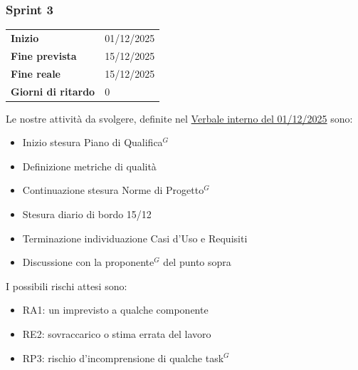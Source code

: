 \subsubsection{Sprint 3}


\begin{tabular}{p{} p{}}
	\textbf{Inizio} & 01/12/2025 \\
	\textbf{Fine prevista} & 15/12/2025 \\
	\textbf{Fine reale} & 15/12/2025 \\
	\textbf{Giorni di ritardo} & 0
\end{tabular}
\newline \newline 
Le nostre attività da svolgere, definite nel \href{https://nullpointersgroup.github.io/Documentazione/output/RTB/Verbali%20Interni/2025-12-01_verbale_interno.pdf}{Verbale interno del 01/12/2025} sono:
\begin{itemize}[itemsep=5pt, parsep=1pt, label=$\scriptstyle\bullet$]
	\item Inizio stesura Piano di Qualifica$^G$
	\item Definizione metriche di qualità
	\item Continuazione stesura Norme di Progetto$^G$
	\item Stesura diario di bordo 15/12
	\item Terminazione individuazione Casi d'Uso e Requisiti
	\item Discussione con la proponente$^G$ del punto sopra
\end{itemize}


I possibili rischi attesi sono:
\begin{itemize}[itemsep=5pt, parsep=1pt, label=$\scriptstyle\bullet$]
	\item RA1: un imprevisto a qualche componente
	\item RE2: sovraccarico o stima errata del lavoro
	\item RP3: rischio d'incomprensione di qualche task$^G$
\end{itemize}


